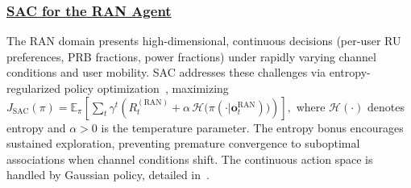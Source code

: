 \documentclass[12pt,lettersize,journal,onecolumn]{IEEEtran}
\begin{document}
\subsubsection{\underline{SAC for the RAN Agent}}
The RAN domain presents high-dimensional, continuous decisions (per-user RU preferences, PRB fractions, power fractions) under rapidly varying channel conditions and user mobility. SAC addresses these challenges via entropy-regularized policy optimization~\cite{icml18haarnoja}, maximizing 
$J_{\text{SAC}}(\pi) = \mathbb{E}_{\pi}\left[\sum_{t}\gamma^{t}\left(R^{\mathrm{(RAN)}}_t + \alpha\,\mathcal{H}\bigl(\pi(\cdot|\mathbf{o}^{\text{RAN}}_t)\bigr)\right)\right],$
where $\mathcal{H}(\cdot)$ denotes entropy and $\alpha>0$ is the temperature parameter. The entropy bonus encourages sustained exploration, preventing premature convergence to suboptimal associations when channel conditions shift. The continuous action space is handled by Gaussian policy, detailed in~\cite[Sec.~III-B]{camad24ebrahimi}. %
\end{document}
